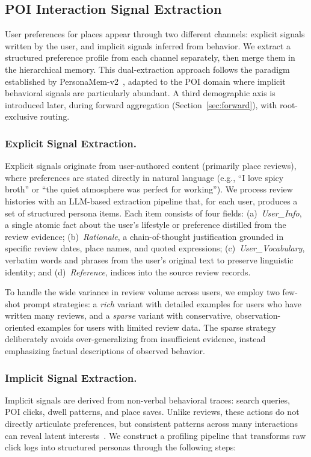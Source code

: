 \documentclass[sigconf,review,anonymous]{acmart}
\begin{document}
\subsection{POI Interaction Signal Extraction}

User preferences for places appear through two different channels: explicit signals written by the user, and implicit signals inferred from behavior. We extract a structured preference profile from each channel separately, then merge them in the hierarchical memory. This dual-extraction approach follows the paradigm established by PersonaMem-v2~\cite{personamem-v2}, adapted to the POI domain where implicit behavioral signals are particularly abundant. A third demographic axis is introduced later, during forward aggregation (Section~\ref{sec:forward}), with root-exclusive routing.

\subsubsection{Explicit Signal Extraction.}
Explicit signals originate from user-authored content (primarily place reviews), where preferences are stated directly in natural language (e.g., ``I love spicy broth'' or ``the quiet atmosphere was perfect for working''). We process review histories with an LLM-based extraction pipeline that, for each user, produces a set of structured persona items. Each item consists of four fields: (a)~\textit{User\_Info}, a single atomic fact about the user's lifestyle or preference distilled from the review evidence; (b)~\textit{Rationale}, a chain-of-thought justification grounded in specific review dates, place names, and quoted expressions; (c)~\textit{User\_Vocabulary}, verbatim words and phrases from the user's original text to preserve linguistic identity; and (d)~\textit{Reference}, indices into the source review records.

To handle the wide variance in review volume across users, we employ two few-shot prompt strategies: a \textit{rich} variant with detailed examples for users who have written many reviews, and a \textit{sparse} variant with conservative, observation-oriented examples for users with limited review data. The sparse strategy deliberately avoids over-generalizing from insufficient evidence, instead emphasizing factual descriptions of observed behavior.

\subsubsection{Implicit Signal Extraction.}
Implicit signals are derived from non-verbal behavioral traces: search queries, POI clicks, dwell patterns, and place saves. Unlike reviews, these actions do not directly articulate preferences, but consistent patterns across many interactions can reveal latent interests~\cite{proex}. We construct a profiling pipeline that transforms raw click logs into structured personas through the following steps:
\end{document}
